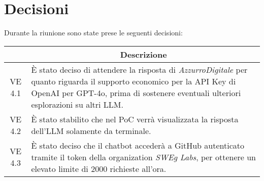 

\section{Decisioni}

Durante la riunione sono state prese le seguenti decisioni:

\vspace{0.5cm}

\begin{table}[htbp]
    \centering
    \begin{tabular}{|c|p{}|}
        \hline
        \rowcolor[gray]{0.75}
        \multicolumn{1}{|c|}{\textbf{Codice}} & \multicolumn{1}{|c|}{\textbf{Descrizione}}\\
        \hline
        VE 4.1 & È stato deciso di attendere la risposta di \emph{AzzurroDigitale} per quanto riguarda il supporto economico
        per la API Key di OpenAI per GPT-4o, prima di sostenere eventuali ulteriori esplorazioni su altri LLM. \\
        \hline
        VE 4.2 & È stato stabilito che nel PoC verrà visualizzata la risposta dell'LLM solamente da terminale. \\
        \hline
        VE 4.3 & È stato deciso che il chatbot accederà a GitHub autenticato tramite il token della organization \emph{SWEg Labs},
        per ottenere un elevato limite di 2000 richieste all'ora. \\
        \hline
    \end{tabular}
    \end{table}
